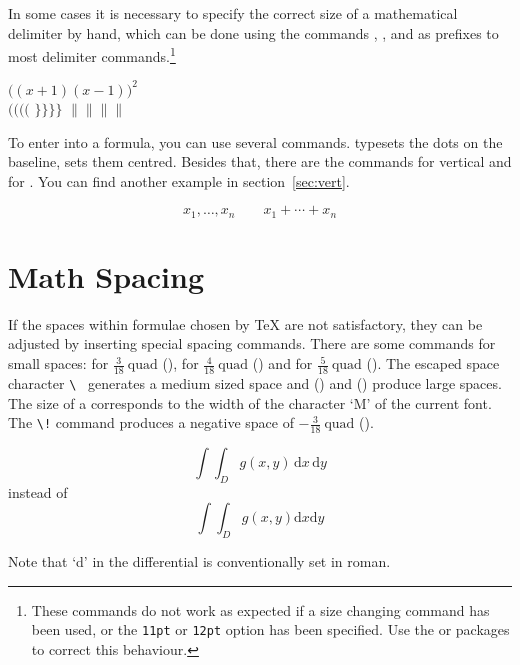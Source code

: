 \pagebreak[4]
In some cases it is necessary to specify the correct size of a
mathematical delimiter by hand,
which can be done using the commands , ,  and
 as prefixes to most delimiter commands.\footnote{These
  commands do not work as expected if a size changing command has been
  used, or the \texttt{11pt} or \texttt{12pt} option has been
  specified.  Use the  or  packages to
  correct this behaviour.}
\begin{example}
$\Big( (x+1) (x-1) \Big) ^{2}$\\
$\big(\Big(\bigg(\Bigg($\quad
$\big\}\Big\}\bigg\}\Bigg\}$\quad
$\big\|\Big\|\bigg\|\Bigg\|$
\end{example}

To enter \textbf{} into a formula, you can use several
commands.  typesets the dots on the baseline, 
sets them centred. Besides that, there are the commands  for
vertical and  for . You can find another example in section~\ref{sec:vert}.
\begin{example}
\begin{displaymath}
x_{1},\ldots,x_{n} \qquad
x_{1}+\cdots+x_{n}
\end{displaymath}
\end{example}
 
\section{Math Spacing}

 If the spaces within formulae chosen by \TeX{}
are not satisfactory, they can be adjusted by inserting special
spacing commands. There are some commands for small spaces: \ci{,} for
$\frac{3}{18}\:\textrm{quad}$ (\demowidth{0.166em}), \ci{:} for $\frac{4}{18}\:
\textrm{quad}$ (\demowidth{0.222em}) and \ci{;} for $\frac{5}{18}\:
\textrm{quad}$ (\demowidth{0.277em}).  The escaped space character
\verb*.\ . generates a medium sized space and 
(\demowidth{1em}) and  (\demowidth{2em}) produce large
spaces. The size of a  corresponds to the width of the
character `M' of the current font.  The \verb|\!| command produces a
negative space of $-\frac{3}{18}\:\textrm{quad}$ (\demowidth{0.166em}).
\begin{example}
\newcommand{\ud}{\mathrm{d}}
\begin{displaymath}
\int\!\!\!\int_{D} g(x,y)
  \, \ud x\, \ud y 
\end{displaymath}
instead of 
\begin{displaymath}
\int\int_{D} g(x,y)\ud x \ud y
\end{displaymath}
\end{example}
Note that `d' in the differential is conventionally set in roman.

